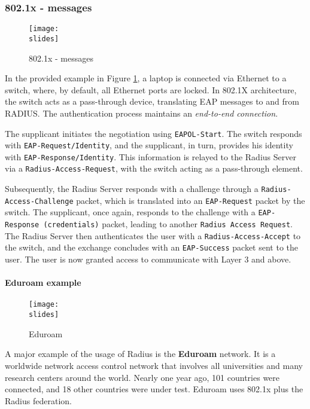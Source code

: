 \subsubsection{802.1x - messages}
\begin{figure}[h]
    \centering
    \texttt{[image: \\slides]}
    \caption{802.1x - messages}
    \label{fig:802.1x-messages}
\end{figure}


In the provided example in Figure \ref*{fig:802.1x-messages}, a laptop is connected via Ethernet to a switch, where, by default, all Ethernet ports are locked.
In 802.1X architecture, the switch acts as a pass-through device, translating EAP messages to and from RADIUS. The authentication process maintains an \textit{end-to-end connection}.

The supplicant initiates the negotiation using \texttt{EAPOL-Start}. The switch responds with \texttt{EAP-Request/Identity}, and the supplicant, in turn, provides his identity with \texttt{EAP-Response/Identity}. This information is relayed to the Radius Server via a \texttt{Radius-Access-Request}, with the switch acting as a pass-through element.

Subsequently, the Radius Server responds with a challenge through a \texttt{Radius-Access-Challenge} packet, which is translated into an \texttt{EAP-Request} packet by the switch.
The supplicant, once again, responds to the challenge with a \texttt{EAP-Response (credentials)} packet, leading to another \texttt{Radius Access Request}. The Radius Server then authenticates the user with a \texttt{Radius-Access-Accept} to the switch, and the exchange concludes with an \texttt{EAP-Success} packet sent to the user. 
The user is now granted access to communicate with Layer 3 and above.


\paragraph{Eduroam example}
\begin{figure}[h]
    \centering
    \texttt{[image: \\slides]}
    \caption{Eduroam}
    \label{fig:eduroam}
\end{figure}

A major example of the usage of Radius is the \textbf{Eduroam} network. It is a worldwide network access control network that involves all universities and many research centers around the world. Nearly one year ago, 101 countries were connected, and 18 other countries were under test. Eduroam uses 802.1x plus the Radius federation.

